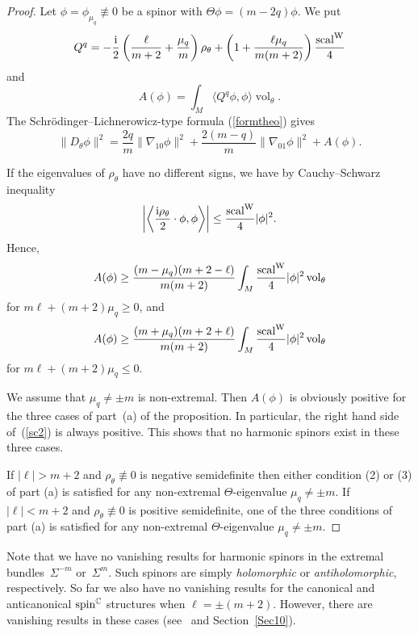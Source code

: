 \documentclass[pdftex]{sigma}
\numberwithin{equation}{section}
\newcommand{\CC}{\mathbb{C}}
\begin{document}
\begin{proof} Let $\phi=\phi_{\mu_q}\not\equiv 0$ be a spinor with $\Theta\phi=(m-2q)\phi$. We put
\begin{gather} \label{KTerm}
Q^q = - \frac{{\rm i}}{2}\left( \frac{\ell}{m+2}+\frac{\mu_q}{m}\right)\rho_\theta + \left(1+\frac{\ell\mu_q}{m(m+2)}\right)\frac{{\rm scal}^{\rm W}}{4}
\end{gather}
and \[A(\phi) = \int_M \big\langle Q^q\phi,\phi\big\rangle \operatorname{vol}_\theta.\]
The Schr\"odinger--Lichnerowicz-type formula (\ref{formtheo}) gives
\begin{equation}\label{sc2}
\|D_\theta\phi\|^2 = \frac{2q}{m}\|\nabla_{10}\phi\|^2 + \frac{2(m-q)}{m}\|\nabla_{01}\phi\|^2 + A(\phi).
\end{equation}

If the eigenvalues of $\rho_\theta$ have no different signs, we have by Cauchy--Schwarz inequality
\[
\left|\left\langle \frac{{\rm i}\rho_\theta}{2}\cdot\phi,\phi\right\rangle\right| \leq \frac{{\rm scal}^{\rm W}}{4}|\phi|^2.
\]
Hence,
\[
A(\phi) \geq \frac{(m-\mu_q)(m+2-\ell)}{m(m+2)} \int_M \frac{{\rm scal}^{\rm W}}{4}|\phi|^2\operatorname{vol}_\theta
\]
for $m\ell+(m+2)\mu_q\geq 0$, and
\[
A(\phi) \geq \frac{(m+\mu_q)(m+2+\ell)}{m(m+2)} \int_M \frac{{\rm scal}^{\rm W}}{4}|\phi|^2\operatorname{vol}_\theta
\]
for $m\ell+(m+2)\mu_q\leq 0$.

We assume that $\mu_q\neq \pm m$ is non-extremal. Then $A(\phi)$ is obviously positive for the three cases of part~(a) of the proposition.
In particular, the right hand side of~(\ref{sc2}) is always positive. This shows that no harmonic spinors exist in these three cases.

If $|\ell|>m+2$ and $\rho_\theta\not\equiv 0$ is negative semidefinite then either condition (2) or (3) of part (a) is satisfied
for any non-extremal $\Theta$-eigenvalue $\mu_q\neq \pm m$. If
$|\ell|<m+2$ and $\rho_\theta\not\equiv 0$ is positive semidefinite, one of the three conditions of part (a) is satisfied
for any non-extremal $\Theta$-eigenvalue $\mu_q\neq \pm m$.
\end{proof}

Note that we have no vanishing results for harmonic spinors in the extremal bundles~$\Sigma^{-m}$ or~$\Sigma^{m}$. Such spinors
are simply {\em holomorphic} or {\em antiholomorphic}, respectively. So far we also have no vanishing results for the canonical and anticanonical ${\rm spin}^\CC$ structures when $\ell=\pm (m+2)$. However, there are vanishing results in these cases (see~\cite{Tan} and Section~\ref{Sec10}).
\end{document}
